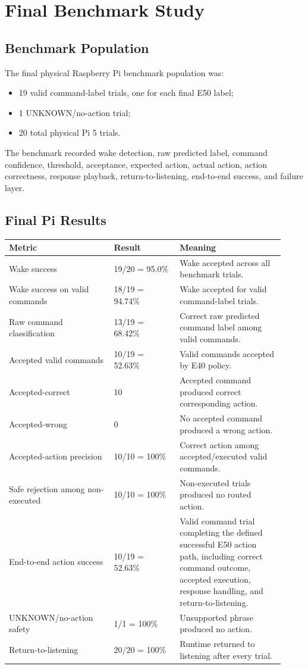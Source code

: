 \documentclass[11pt]{article}
\begin{document}
\section{Final Benchmark Study}

\subsection{Benchmark Population}

The final physical Raspberry Pi benchmark population was:

\begin{itemize}
\item 19 valid command-label trials, one for each final E50 label;
\item 1 UNKNOWN/no-action trial;
\item 20 total physical Pi 5 trials.
\end{itemize}

The benchmark recorded wake detection, raw predicted label, command confidence, threshold, acceptance, expected action, actual action, action correctness, response playback, return-to-listening, end-to-end success, and failure layer.

\subsection{Final Pi Results}

\begin{longtable}{p{0.35\linewidth}p{0.22\linewidth}p{0.35\linewidth}}
\toprule
\textbf{Metric} & \textbf{Result} & \textbf{Meaning} \\
\midrule
Wake success & 19/20 = 95.0\% & Wake accepted across all benchmark trials. \\
Wake success on valid commands & 18/19 = 94.74\% & Wake accepted for valid command-label trials. \\
Raw command classification & 13/19 = 68.42\% & Correct raw predicted command label among valid commands. \\
Accepted valid commands & 10/19 = 52.63\% & Valid commands accepted by E40 policy. \\
Accepted-correct & 10 & Accepted command produced correct corresponding action. \\
Accepted-wrong & 0 & No accepted command produced a wrong action. \\
Accepted-action precision & 10/10 = 100\% & Correct action among accepted/executed valid commands. \\
Safe rejection among non-executed & 10/10 = 100\% & Non-executed trials produced no routed action. \\
End-to-end action success & 10/19 = 52.63\% & Valid command trial completing the defined successful E50 action path, including correct command outcome, accepted execution, response handling, and return-to-listening. \\
UNKNOWN/no-action safety & 1/1 = 100\% & Unsupported phrase produced no action. \\
Return-to-listening & 20/20 = 100\% & Runtime returned to listening after every trial. \\
\bottomrule
\end{longtable}
\end{document}
